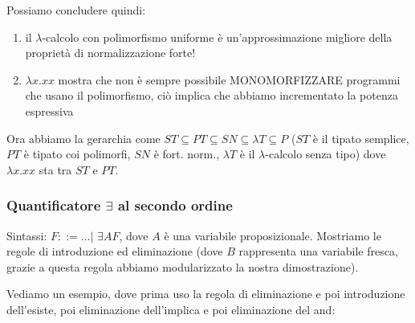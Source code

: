 \documentclass{article}
\begin{document}
\bigskip

Possiamo concludere quindi:
\begin{enumerate}
    \item il $\lambda$-calcolo con polimorfismo uniforme è un'approssimazione migliore della proprietà di normalizzazione forte!
    \item $\lambda x.xx$ mostra che non è sempre possibile MONOMORFIZZARE programmi che usano il polimorfismo, ciò implica che {\color{red}abbiamo incrementato la potenza espressiva}
\end{enumerate}
Ora abbiamo la gerarchia come $ST \subseteq PT \subseteq SN \subseteq \lambda T \subseteq P$ ($ST$ è il tipato semplice, $PT$ è tipato coi polimorfi, $SN$ è fort. norm., $\lambda T$ è il $\lambda$-calcolo senza tipo) dove $\lambda x.xx$ sta tra $ST$ e $PT$.

\subsubsection{Quantificatore $\exists$ al secondo ordine}
Sintassi: $F::= ... | \,\,\exists AF$, dove $A$ è una variabile proposizionale. Mostriamo le regole di introduzione ed eliminazione (dove $B$ rappresenta una variabile fresca, grazie a questa regola abbiamo modularizzato la nostra dimostrazione).

\bigskip

\begin{minipage}{0.49\textwidth}
\end{minipage}
{
\hspace{2em}
\begin{minipage}{0.49\textwidth}
\end{minipage}}

\bigskip

Vediamo un esempio, dove prima uso la regola di eliminazione e poi introduzione dell'esiste, poi eliminazione dell'implica e poi eliminazione del and:

\bigskip

\end{document}
